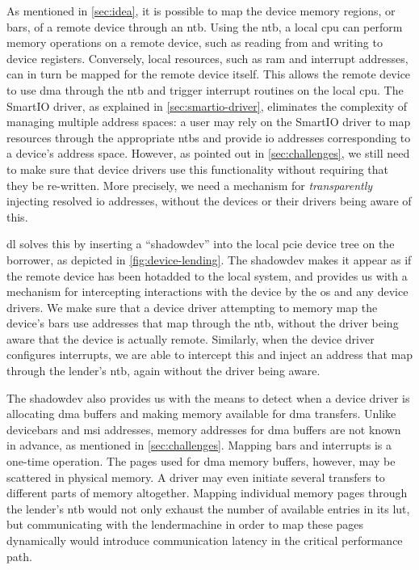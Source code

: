 As mentioned in \cref{sec:idea}, it is possible to map the device memory regions, or \glspl{bar}, of a remote device through an \gls{ntb}.
%
Using the \gls{ntb}, a local \gls{cpu} can perform memory operations on a remote device, such as reading from and writing to device registers.
%
Conversely, local resources, such as \gls{ram} and interrupt addresses, can in turn be mapped for the remote device itself. 
%
This allows the remote device to use \gls{dma} through the \gls{ntb} and trigger interrupt routines on the local \gls{cpu}.
%
The SmartIO driver, as explained in \cref{sec:smartio-driver}, eliminates the complexity of managing multiple address spaces: a user may rely on the SmartIO driver to map resources through the appropriate \glspl{ntb} and provide \gls{io} addresses corresponding to a device's address space.
%
However, as pointed out in \cref{sec:challenges}, we still need to make sure that device drivers use this functionality without requiring that they be re-written. 
%
More precisely, we need a mechanism for \emph{transparently} injecting resolved \gls{io} addresses, without the devices or their drivers being aware of this.



\Gls{dl} solves this by inserting a ``\gls{shadowdev}'' into the local \gls{pcie} device tree on the \gls{borrower}, as depicted in \cref{fig:device-lending}. 
%
The \gls{shadowdev} makes it appear as if the remote device has been \gls{hotadded} to the local system, and provides us with a mechanism for intercepting interactions with the device by the \gls{os} and any device drivers. 
%
We make sure that a device driver attempting to memory map the device's \glspl{bar} use addresses that map through the \gls{ntb}, without the driver being aware that the device is actually remote.
%
Similarly, when the device driver configures interrupts, we are able to intercept this and inject an address that map through the \gls{lender}'s \gls{ntb}, again without the driver being aware.



The \gls{shadowdev} also provides us with the means to detect when a device driver is allocating \gls{dma} buffers and making memory available for \gls{dma} transfers.
%
Unlike \glspl{devicebar} and \gls{msi} addresses, memory addresses for \gls{dma} buffers are not known in advance, as mentioned in \cref{sec:challenges}.
%
Mapping \glspl{bar} and interrupts is a one-time operation.
%
The pages used for \gls{dma} memory buffers, however, may be scattered in physical memory.
%
A driver may even initiate several transfers to different parts of memory altogether.
%
Mapping individual memory pages through the \gls{lender}'s \gls{ntb} would not only exhaust the number of available entries in its \gls{lut}, but communicating with the \gls{lendermachine} in order to map these pages dynamically would introduce communication latency in the critical performance path.



